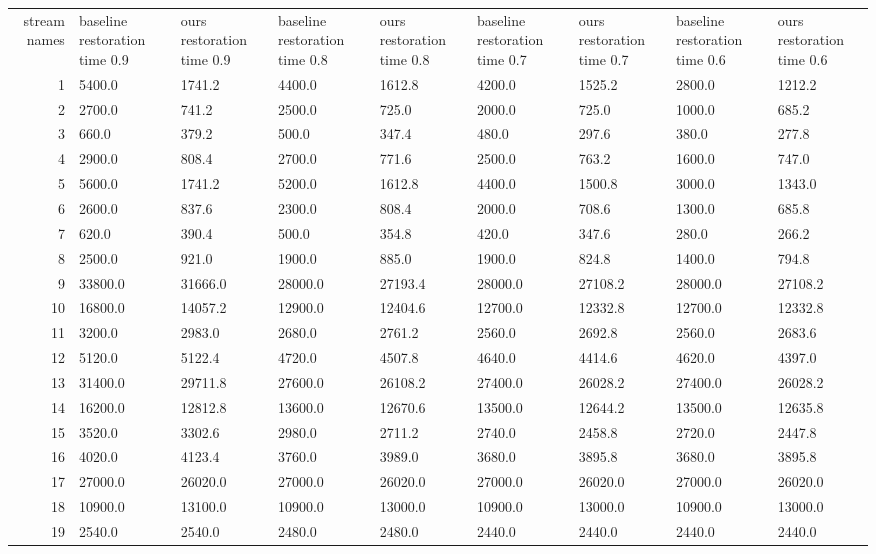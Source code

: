 \begin{tabular}{|r|l|l|l|l|l|l|l|l|}
  \hline
  stream names & baseline restoration time 0.9 & ours restoration time 0.9 & baseline restoration time 0.8 & ours restoration time 0.8 & baseline restoration time 0.7 & ours restoration time 0.7 & baseline restoration time 0.6 & ours restoration time 0.6 \\ 
  1 & 5400.0 & 1741.2 & 4400.0 & 1612.8 & 4200.0 & 1525.2 & 2800.0 & 1212.2 \\ 
  2 & 2700.0 & 741.2 & 2500.0 & 725.0 & 2000.0 & 725.0 & 1000.0 & 685.2 \\ 
  3 & 660.0 & 379.2 & 500.0 & 347.4 & 480.0 & 297.6 & 380.0 & 277.8 \\ 
  4 & 2900.0 & 808.4 & 2700.0 & 771.6 & 2500.0 & 763.2 & 1600.0 & 747.0 \\ 
  5 & 5600.0 & 1741.2 & 5200.0 & 1612.8 & 4400.0 & 1500.8 & 3000.0 & 1343.0 \\ 
  6 & 2600.0 & 837.6 & 2300.0 & 808.4 & 2000.0 & 708.6 & 1300.0 & 685.8 \\ 
  7 & 620.0 & 390.4 & 500.0 & 354.8 & 420.0 & 347.6 & 280.0 & 266.2 \\ 
  8 & 2500.0 & 921.0 & 1900.0 & 885.0 & 1900.0 & 824.8 & 1400.0 & 794.8 \\ 
  9 & 33800.0 & 31666.0 & 28000.0 & 27193.4 & 28000.0 & 27108.2 & 28000.0 & 27108.2 \\ 
  10 & 16800.0 & 14057.2 & 12900.0 & 12404.6 & 12700.0 & 12332.8 & 12700.0 & 12332.8 \\ 
  11 & 3200.0 & 2983.0 & 2680.0 & 2761.2 & 2560.0 & 2692.8 & 2560.0 & 2683.6 \\ 
  12 & 5120.0 & 5122.4 & 4720.0 & 4507.8 & 4640.0 & 4414.6 & 4620.0 & 4397.0 \\ 
  13 & 31400.0 & 29711.8 & 27600.0 & 26108.2 & 27400.0 & 26028.2 & 27400.0 & 26028.2 \\ 
  14 & 16200.0 & 12812.8 & 13600.0 & 12670.6 & 13500.0 & 12644.2 & 13500.0 & 12635.8 \\ 
  15 & 3520.0 & 3302.6 & 2980.0 & 2711.2 & 2740.0 & 2458.8 & 2720.0 & 2447.8 \\ 
  16 & 4020.0 & 4123.4 & 3760.0 & 3989.0 & 3680.0 & 3895.8 & 3680.0 & 3895.8 \\ 
  17 & 27000.0 & 26020.0 & 27000.0 & 26020.0 & 27000.0 & 26020.0 & 27000.0 & 26020.0 \\ 
  18 & 10900.0 & 13100.0 & 10900.0 & 13000.0 & 10900.0 & 13000.0 & 10900.0 & 13000.0 \\ 
  19 & 2540.0 & 2540.0 & 2480.0 & 2480.0 & 2440.0 & 2440.0 & 2440.0 & 2440.0 \\ 

\end{tabular}
